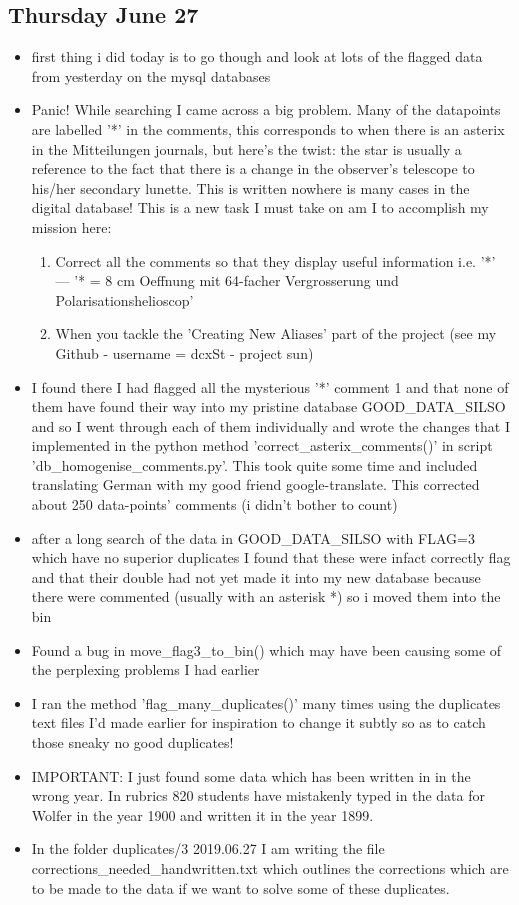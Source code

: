 \documentclass[12pt]{article}
\begin{document}
\subsection{Thursday June 27}
\begin{itemize}
    \item first thing i did today is to go though and look at lots of the flagged data from yesterday on the mysql databases
    \item Panic! While searching I came across a big problem. Many of the datapoints are labelled '*' in the comments, this corresponds to when there is an asterix in the Mitteilungen journals, but here's the twist: the star is usually a reference to the fact that there is a change in the observer's telescope to his/her secondary lunette. This is written nowhere is many cases in the digital database! This is a new task I must take on am I to accomplish my mission here:
    \begin{enumerate}
        \item Correct all the comments so that they display useful information i.e. '*' --- '* = 8 cm Oeffnung mit 64-facher Vergrosserung und Polarisationshelioscop'
        \item When you tackle the 'Creating New Aliases' part of the project (see my Github - username = dcxSt - project sun)
    \end{enumerate}
    \item I found there I had flagged all the mysterious '*' comment 1 and that none of them have found their way into my pristine database GOOD\_DATA\_SILSO and so I went through each of them individually and wrote the changes that I implemented in the python method 'correct\_asterix\_comments()' in script 'db\_homogenise\_comments.py'. This took quite some time and included translating German with my good friend google-translate. This corrected about 250 data-points' comments (i didn't bother to count)
    \item after a long search of the data in GOOD\_DATA\_SILSO with FLAG=3 which have no superior duplicates I found that these were infact correctly flag and that their double had not yet made it into my new database because there were commented (usually with an asterisk *) so i moved them into the bin
    \item Found a bug in move\_flag3\_to\_bin() which may have been causing some of the perplexing problems I had earlier
    \item I ran the method 'flag\_many\_duplicates()' many times using the duplicates text files I'd made earlier for inspiration to change it subtly so as to catch those sneaky no good duplicates!
    \item IMPORTANT: I just found some data which has been written in in the wrong year. In rubrics 820 students have mistakenly typed in the data for Wolfer in the year 1900 and written it in the year 1899.
    \item In the folder duplicates/3 2019.06.27 I am writing the file corrections\_needed\_handwritten.txt which outlines the corrections which are to be made to the data if we want to solve some of these duplicates.
\end{itemize}
    
\end{document}
